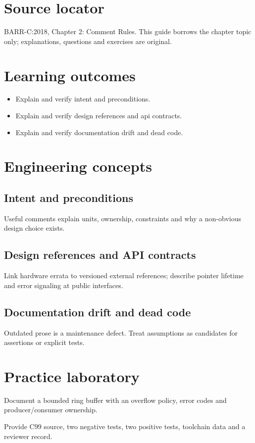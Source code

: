 \documentclass[10pt,letterpaper]{article}
\begin{document}
\makedoctitle
\makedocsummary
\section{Source locator}
BARR-C:2018, Chapter 2: Comment Rules. This guide borrows the chapter topic only; explanations, questions and exercises are original.
\section{Learning outcomes}
\begin{itemize}
\item Explain and verify intent and preconditions.
\item Explain and verify design references and api contracts.
\item Explain and verify documentation drift and dead code.
\end{itemize}

\section{Engineering concepts}
\subsection{Intent and preconditions}
Useful comments explain units, ownership, constraints and why a non-obvious design choice exists.

\subsection{Design references and API contracts}
Link hardware errata to versioned external references; describe pointer lifetime and error signaling at public interfaces.

\subsection{Documentation drift and dead code}
Outdated prose is a maintenance defect. Treat assumptions as candidates for assertions or explicit tests.

\section{Practice laboratory}
Document a bounded ring buffer with an overflow policy, error codes and producer/consumer ownership.

Provide C99 source, two negative tests, two positive tests, toolchain data and a reviewer record.
\end{document}
